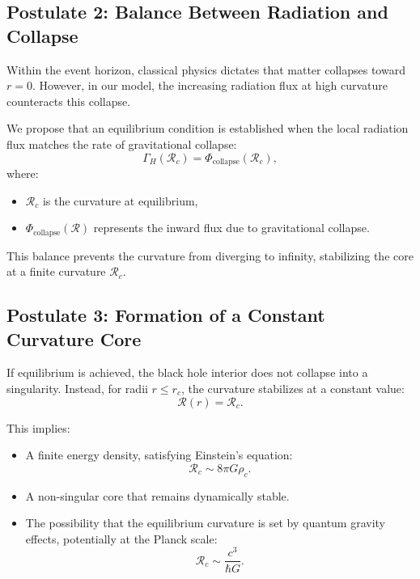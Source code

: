\subsection{Postulate 2: Balance Between Radiation and Collapse}
Within the event horizon, classical physics dictates that matter collapses toward \( r=0 \). However, in our model, the increasing radiation flux at high curvature counteracts this collapse. 

We propose that an equilibrium condition is established when the local radiation flux matches the rate of gravitational collapse:
\begin{equation}
    \Gamma_H(\mathcal{R}_c) = \Phi_{\text{collapse}}(\mathcal{R}_c),
\end{equation}
where:
\begin{itemize}
    \item \( \mathcal{R}_c \) is the curvature at equilibrium,
    \item \( \Phi_{\text{collapse}}(\mathcal{R}) \) represents the inward flux due to gravitational collapse.
\end{itemize}

This balance prevents the curvature from diverging to infinity, stabilizing the core at a finite curvature \( \mathcal{R}_c \).

\subsection{Postulate 3: Formation of a Constant Curvature Core}
If equilibrium is achieved, the black hole interior does not collapse into a singularity. Instead, for radii \( r \leq r_c \), the curvature stabilizes at a constant value:
\begin{equation}
    \mathcal{R}(r) = \mathcal{R}_c.
\end{equation}

This implies:
\begin{itemize}
    \item A finite energy density, satisfying Einstein’s equation:
    \begin{equation}
        \mathcal{R}_c \sim 8\pi G \rho_c.
    \end{equation}
    \item A non-singular core that remains dynamically stable.
    \item The possibility that the equilibrium curvature is set by quantum gravity effects, potentially at the Planck scale:
    \begin{equation}
        \mathcal{R}_c \sim \frac{c^3}{\hbar G}.
    \end{equation}
\end{itemize}

